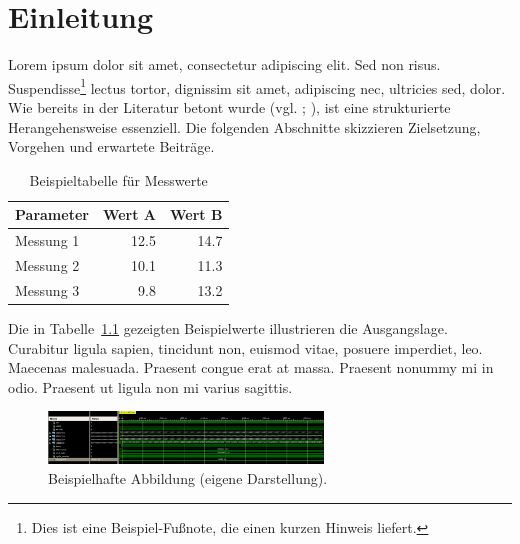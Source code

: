 \chapter{Einleitung}

\begin{A1}
Lorem ipsum dolor sit amet, consectetur adipiscing elit. Sed non risus. 
Suspendisse\footnote{Dies ist eine Beispiel-Fußnote, die einen kurzen Hinweis liefert.} 
lectus tortor, dignissim sit amet, adipiscing nec, ultricies sed, dolor. 
Wie bereits in der Literatur betont wurde (vgl. \cite{knuth1984}; \cite{meyer2012}), 
ist eine strukturierte Herangehensweise essenziell. 
Die folgenden Abschnitte skizzieren Zielsetzung, Vorgehen und erwartete Beiträge.
\end{A1}

\begin{table}[h]
  \centering
  \caption{Beispieltabelle für Messwerte}
  \label{tab:messwerte}
  \begin{tabular}{lrr}
    \toprule
    Parameter & Wert A & Wert B \\
    \midrule
    Messung 1 & 12.5 & 14.7 \\
    Messung 2 & 10.1 & 11.3 \\
    Messung 3 &  9.8 & 13.2 \\
    \bottomrule
  \end{tabular}
\end{table}

\begin{A2}
Die in Tabelle~\ref{tab:messwerte} gezeigten Beispielwerte illustrieren die Ausgangslage. 
Curabitur ligula sapien, tincidunt non, euismod vitae, posuere imperdiet, leo. 
Maecenas malesuada. Praesent congue erat at massa. 
Praesent nonummy mi in odio. Praesent ut ligula non mi varius sagittis.
\end{A2}

\begin{figure}[H]
  \centering
  \includegraphics[width=0.65\textwidth]{figures/beispielbild.png}
  \caption{Beispielhafte Abbildung (eigene Darstellung).}
  \label{fig:beispiel}
\end{figure}

